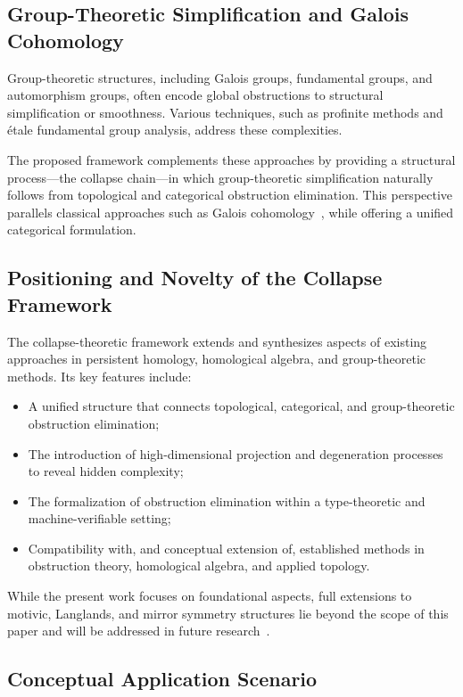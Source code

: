 \documentclass[11pt]{article}
\begin{document}
\subsection{Group-Theoretic Simplification and Galois Cohomology}

Group-theoretic structures, including Galois groups, fundamental groups, and automorphism groups, often encode global obstructions to structural simplification or smoothness. Various techniques, such as profinite methods and étale fundamental group analysis, address these complexities.

The proposed framework complements these approaches by providing a structural process—the collapse chain—in which group-theoretic simplification naturally follows from topological and categorical obstruction elimination. This perspective parallels classical approaches such as Galois cohomology~\cite{Serre1997}, while offering a unified categorical formulation.

\subsection{Positioning and Novelty of the Collapse Framework}

The collapse-theoretic framework extends and synthesizes aspects of existing approaches in persistent homology, homological algebra, and group-theoretic methods. Its key features include:

\begin{itemize}
    \item A unified structure that connects topological, categorical, and group-theoretic obstruction elimination;
    \item The introduction of high-dimensional projection and degeneration processes to reveal hidden complexity;
    \item The formalization of obstruction elimination within a type-theoretic and machine-verifiable setting;
    \item Compatibility with, and conceptual extension of, established methods in obstruction theory, homological algebra, and applied topology.
\end{itemize}

While the present work focuses on foundational aspects, full extensions to motivic, Langlands, and mirror symmetry structures lie beyond the scope of this paper and will be addressed in future research~\cite{MirrorSymmetry2003}.

\subsection{Conceptual Application Scenario}
\end{document}
